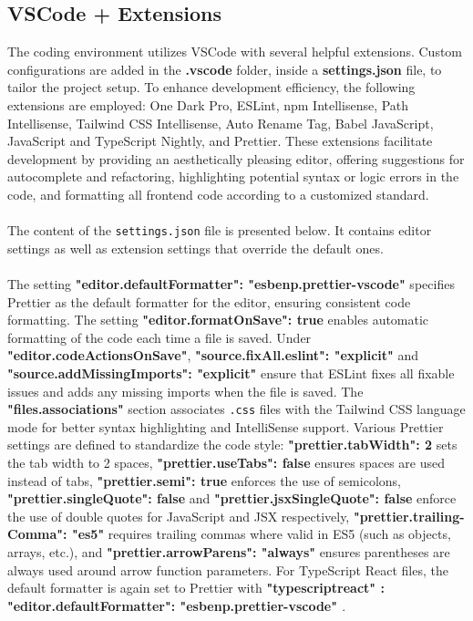 \subsection{VSCode + Extensions}

\noindent The coding environment utilizes VSCode with several helpful extensions. Custom configurations are added in the \textbf{.vscode} folder, inside a \textbf{settings.json} file, to tailor the project setup. To enhance development efficiency, the following extensions are employed: One Dark Pro, ESLint, npm Intellisense, Path Intellisense, Tailwind CSS Intellisense, Auto Rename Tag, Babel JavaScript, JavaScript and TypeScript Nightly, and Prettier. These extensions facilitate development by providing an aesthetically pleasing editor, offering suggestions for autocomplete and refactoring, highlighting potential syntax or logic errors in the code, and formatting all frontend code according to a customized standard. 
\\\\
\noindent The content of the \texttt{settings.json} file is presented below. It contains editor settings as well as extension settings that override the default ones.
\\\\
 \noindent The setting \textbf{"editor.defaultFormatter": "esbenp.prettier-vscode"} specifies Prettier as the default formatter for the editor, ensuring consistent code formatting. The setting \textbf{"editor.formatOnSave": true} enables automatic formatting of the code each time a file is saved. Under \textbf{"editor.codeActionsOnSave"}, \textbf{"source.fixAll.eslint": "explicit"} and \textbf{"source.addMissingImports": "explicit"} ensure that ESLint fixes all fixable issues and adds any missing imports when the file is saved. The \textbf{"files.associations"} section associates \texttt{.css} files with the Tailwind CSS language mode for better syntax highlighting and IntelliSense support. Various Prettier settings are defined to standardize the code style: \textbf{"prettier.tabWidth": 2} sets the tab width to 2 spaces, \textbf{"prettier.useTabs": false} ensures spaces are used instead of tabs, \textbf{"prettier.semi": true} enforces the use of semicolons, \textbf{"prettier.singleQuote": false} and \textbf{"prettier.jsxSingleQuote": false} enforce the use of double quotes for JavaScript and JSX respectively, \textbf{"prettier.trailing-\\Comma": "es5"} requires trailing commas where valid in ES5 (such as objects, arrays, etc.), and \textbf{"prettier.arrowParens": "always"} ensures parentheses are always used around arrow function parameters. For TypeScript React files, the default formatter is again set to Prettier with \textbf{"typescriptreact" : { "editor.defaultFormatter": "esbenp.prettier-vscode" }}.

